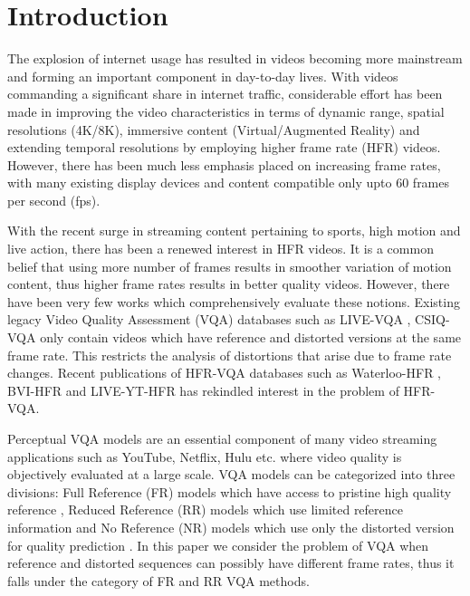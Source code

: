 \documentclass[conference]{IEEEtran}
\begin{document}
\section{Introduction}
The explosion of internet usage has resulted in videos becoming more mainstream and forming an important component in day-to-day lives. With videos commanding a significant share in internet traffic, considerable effort has been made in improving the video characteristics in terms of dynamic range, spatial resolutions (4K/8K), immersive content (Virtual/Augmented Reality) and extending temporal resolutions by employing higher frame rate (HFR) videos. However, there has been much less emphasis placed on increasing frame rates, with many existing display devices and content compatible only upto 60 frames per second (fps).

With the recent surge in streaming content pertaining to sports, high motion and live action, there has been a renewed interest in HFR videos. It is a common belief that using more number of frames results in smoother variation of motion content, thus higher frame rates results in better quality videos. However, there have been very few works which comprehensively evaluate these notions. Existing legacy Video Quality Assessment (VQA) databases such as LIVE-VQA \cite{seshadrinathan2010study}, CSIQ-VQA \cite{vu2014vis3} only contain videos which have reference and distorted versions at the same frame rate. This restricts the analysis of distortions that arise due to frame rate changes. Recent publications of HFR-VQA databases such as Waterloo-HFR \cite{nasiri2015perceptual}, BVI-HFR \cite{mackin2018study} and LIVE-YT-HFR \cite{pavan2020liveythfr} has rekindled interest in the problem of HFR-VQA.

Perceptual VQA models are an essential component of many video streaming applications such as YouTube, Netflix, Hulu etc. where video quality is objectively evaluated at a large scale. VQA models can be categorized into three divisions: Full Reference (FR) models which have access to pristine high quality reference \cite{wang2004image,wang2003multiscale,sheikh2006image,zhang2011fsim,seshadrinathan2009motion}, Reduced Reference (RR) models which use limited reference information \cite{soundararajan2012rred,soundararajan2012video} and No Reference (NR) models which use only the distorted version for quality prediction \cite{mittal2012no,mittal2013making,saad2014blind}. In this paper we consider the problem of VQA when reference and distorted sequences can possibly have different frame rates, thus it falls under the category of FR and RR VQA methods.
\end{document}
